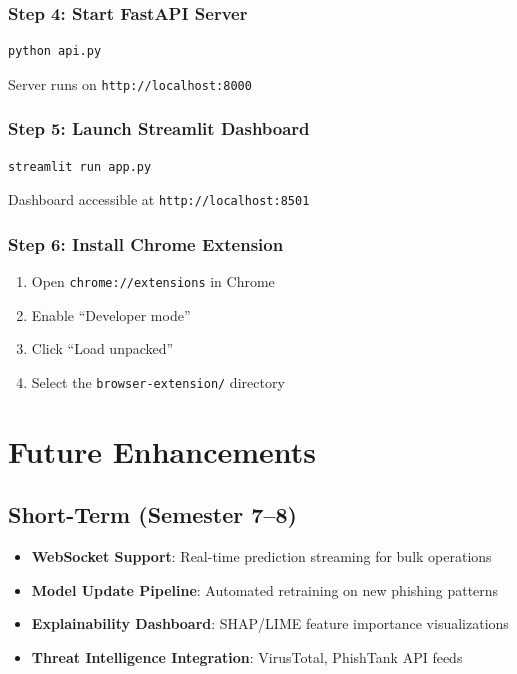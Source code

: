 \documentclass[12pt,a4paper]{report}
\begin{document}
\subsection{Step 4: Start FastAPI Server}
\begin{lstlisting}[language=bash]
python api.py
\end{lstlisting}

Server runs on \texttt{http://localhost:8000}

\subsection{Step 5: Launch Streamlit Dashboard}
\begin{lstlisting}[language=bash]
streamlit run app.py
\end{lstlisting}

Dashboard accessible at \texttt{http://localhost:8501}

\subsection{Step 6: Install Chrome Extension}
\begin{enumerate}[leftmargin=*]
    \item Open \texttt{chrome://extensions} in Chrome
    \item Enable ``Developer mode''
    \item Click ``Load unpacked''
    \item Select the \texttt{browser-extension/} directory
\end{enumerate}

\chapter{Future Enhancements}

\section{Short-Term (Semester 7--8)}

\begin{itemize}[leftmargin=*]
    \item \textbf{WebSocket Support}: Real-time prediction streaming for bulk operations
    \item \textbf{Model Update Pipeline}: Automated retraining on new phishing patterns
    \item \textbf{Explainability Dashboard}: SHAP/LIME feature importance visualizations
    \item \textbf{Threat Intelligence Integration}: VirusTotal, PhishTank API feeds
\end{itemize}
\end{document}

